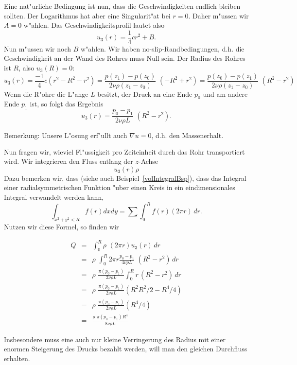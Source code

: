 Eine nat"urliche Bedingung ist nun, dass die Geschwindigkeiten endlich bleiben sollten. 
Der Logarithmus hat aber eine Singularit"at bei $r=0$. Daher m"ussen
wir $A=0$ w"ahlen. Das Geschwindigkeitsprofil lautet also
$$u_3(r) = \frac 1 4 cr^2+ B.$$
Nun m"ussen wir noch $B$ w"ahlen. Wir haben no-slip-Randbedingungen, d.h. die 
Geschwindigkeit an der Wand des Rohres muss Null sein. Der Radius des Rohres ist $R$, also $u_3(R)=0$:
$$ u_3(r) = \frac {-1} 4 c(r^2-R^2-r^2) = 
 \frac{p(z_1)-p(z_0)}{2 \nu\rho(z_1-z_0)}\,\, (-R^2+r^2)
 =
 \frac{p(z_0)-p(z_1)}{2 \nu\rho(z_1-z_0)}\,\, (R^2-r^2)
$$
Wenn die R"ohre die L"ange $L$ besitzt, der Druck an eine Ende $p_0$ und am andere 
Ende $p_1$ ist, so folgt  das Ergebnis
$$ u_3(r) = 
 \frac{p_0-p_1}{2 \nu\rho L}\,\, (R^2-r^2).
$$

Bemerkung: Unsere L"osung erf"ullt auch $\nabla u=0$, d.h. den Massenerhalt. 

Nun fragen wir, wieviel Fl"ussigkeit pro Zeiteinheit durch das Rohr transportiert 
wird. Wir integrieren den Fluss entlang der $z$-Achse
$$ u_3(r) \rho$$
Dazu bemerken wir, dass (siehe auch Beispiel~\ref{volIntegralBsp}), dass
das Integral einer radialsymmetrischen Funktion "uber einen Kreis 
in ein eindimensionales Integral verwandelt werden kann, 
$$ \int_{x^2+y^2<R} f(r) dxdy = \sum \int_0^R f(r) (2\pi r)\, dr.$$
Nutzen wir diese Formel, so finden wir

\begin{eqnarray*}
Q & = & \int_0^R \rho\,\,(2\pi r)u_3(r)\, dr\\
& = & \rho\,\,\int_0^R 2\pi r \frac{p_0-p_1}{4\nu\rho L}\,\, (R^2-r^2)\, dr\\
 & = & \rho\,\, \frac{\pi(p_0-p_1)}{2\nu\rho L} \int_0^R  r \, (R^2-r^2)\, dr\\
  & = &  \rho\,\,\frac{\pi(p_0-p_1)}{2\nu\rho L} \left(R^2 R^2/2-R^4/4\right)\\
    & = & \rho\,\, \frac{\pi(p_0-p_1)}{2\nu\rho L} \left(R^4/4\right)\\
        & = &  \frac{\rho\,\,\pi(p_0-p_1) R^4}{8\nu\rho L}
\end{eqnarray*}
\par\medskip
Insbesondere muss eine auch nur kleine Verringerung des Radius mit einer enormen 
Steigerung des Drucks bezahlt werden, will man den gleichen 
Durchfluss erhalten.

\begin{auf}\chd\label{block11A1}

\end{auf}
